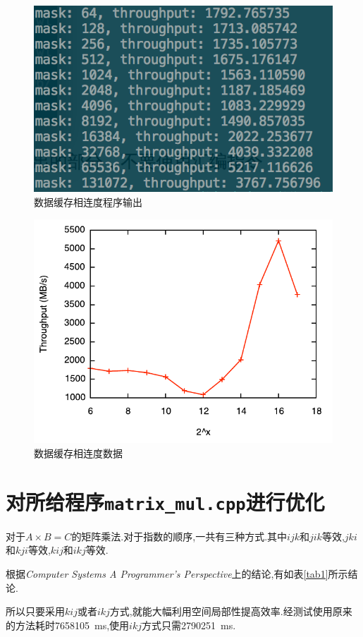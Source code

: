 \documentclass[adobefonts, nocap]{ctexart}
\begin{document}
      \begin{figure}[htbp]
        \includegraphics[width=12cm]{5.png}
        \caption{数据缓存相连度程序输出}
        \label{fig5}
      \end{figure}

      \begin{figure}[htbp]
        \includegraphics[width=12cm]{6.pdf}
        \caption{数据缓存相连度数据}
        \label{fig6}
      \end{figure}
      \clearpage
  \section{对所给程序\texttt{matrix\_mul.cpp}进行优化}
    对于$A\times B=C$的矩阵乘法.对于指数的顺序,一共有三种方式.其中$ijk$和$jik$等效,$jki$和$kji$等效,$kij$和$ikj$等效.

    根据\textit{Computer Systems A Programmer's Perspective}上的结论,有如表\ref{tab1}所示结论.

    所以只要采用$kij$或者$ikj$方式,就能大幅利用空间局部性提高效率.经测试使用原来的方法耗时\SI{7658105}{\ms},使用$ikj$方式只需\SI{2790251}{\ms}.
\end{document}
